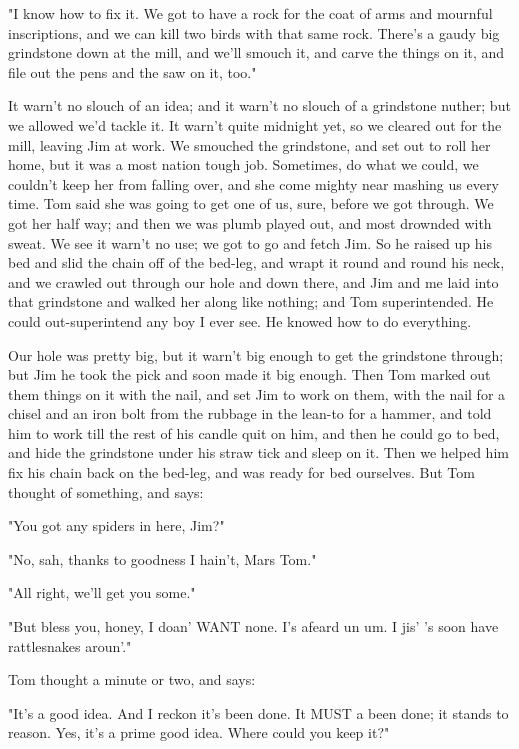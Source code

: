 "I know how to fix it.  We got to have a rock for the coat of arms and
mournful inscriptions, and we can kill two birds with that same rock.
There's a gaudy big grindstone down at the mill, and we'll smouch it, and
carve the things on it, and file out the pens and the saw on it, too."

It warn't no slouch of an idea; and it warn't no slouch of a grindstone
nuther; but we allowed we'd tackle it.  It warn't quite midnight yet, so
we cleared out for the mill, leaving Jim at work.  We smouched the
grindstone, and set out to roll her home, but it was a most nation tough
job. Sometimes, do what we could, we couldn't keep her from falling over,
and she come mighty near mashing us every time.  Tom said she was going
to get one of us, sure, before we got through.  We got her half way; and
then we was plumb played out, and most drownded with sweat.  We see it
warn't no use; we got to go and fetch Jim. So he raised up his bed and
slid the chain off of the bed-leg, and wrapt it round and round his neck,
and we crawled out through our hole and down there, and Jim and me laid
into that grindstone and walked her along like nothing; and Tom
superintended.  He could out-superintend any boy I ever see.  He knowed
how to do everything.

Our hole was pretty big, but it warn't big enough to get the grindstone
through; but Jim he took the pick and soon made it big enough.  Then Tom
marked out them things on it with the nail, and set Jim to work on them,
with the nail for a chisel and an iron bolt from the rubbage in the
lean-to for a hammer, and told him to work till the rest of his candle
quit on him, and then he could go to bed, and hide the grindstone under
his straw tick and sleep on it.  Then we helped him fix his chain back on
the bed-leg, and was ready for bed ourselves.  But Tom thought of
something, and says:

"You got any spiders in here, Jim?"

"No, sah, thanks to goodness I hain't, Mars Tom."

"All right, we'll get you some."

"But bless you, honey, I doan' WANT none.  I's afeard un um.  I jis' 's
soon have rattlesnakes aroun'."

Tom thought a minute or two, and says:

"It's a good idea.  And I reckon it's been done.  It MUST a been done; it
stands to reason.  Yes, it's a prime good idea.  Where could you keep
it?"

